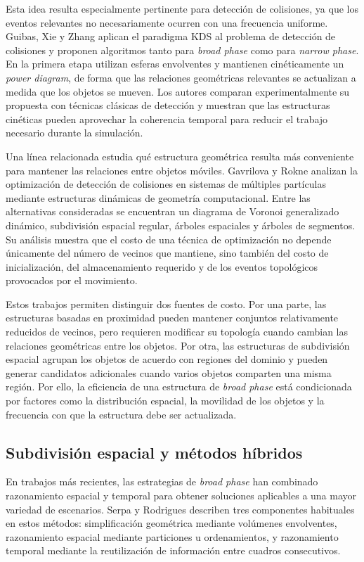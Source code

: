 \documentclass[12pt]{article}
\begin{document}
Esta idea resulta especialmente pertinente para detección de colisiones, ya que los eventos relevantes no necesariamente ocurren con una frecuencia uniforme. Guibas, Xie y Zhang \cite{guibas2001kinetic} aplican el paradigma KDS al problema de detección de colisiones y proponen algoritmos tanto para \textit{broad phase} como para \textit{narrow phase}. En la primera etapa utilizan esferas envolventes y mantienen cinéticamente un \textit{power diagram}, de forma que las relaciones geométricas relevantes se actualizan a medida que los objetos se mueven. Los autores comparan experimentalmente su propuesta con técnicas clásicas de detección y muestran que las estructuras cinéticas pueden aprovechar la coherencia temporal para reducir el trabajo necesario durante la simulación.

Una línea relacionada estudia qué estructura geométrica resulta más conveniente para mantener las relaciones entre objetos móviles. Gavrilova y Rokne \cite{gavrilova2003collision} analizan la optimización de detección de colisiones en sistemas de múltiples partículas mediante estructuras dinámicas de geometría computacional. Entre las alternativas consideradas se encuentran un diagrama de Voronoi generalizado dinámico, subdivisión espacial regular, árboles espaciales y árboles de segmentos. Su análisis muestra que el costo de una técnica de optimización no depende únicamente del número de vecinos que mantiene, sino también del costo de inicialización, del almacenamiento requerido y de los eventos topológicos provocados por el movimiento.

Estos trabajos permiten distinguir dos fuentes de costo. Por una parte, las estructuras basadas en proximidad pueden mantener conjuntos relativamente reducidos de vecinos, pero requieren modificar su topología cuando cambian las relaciones geométricas entre los objetos. Por otra, las estructuras de subdivisión espacial agrupan los objetos de acuerdo con regiones del dominio y pueden generar candidatos adicionales cuando varios objetos comparten una misma región. Por ello, la eficiencia de una estructura de \textit{broad phase} está condicionada por factores como la distribución espacial, la movilidad de los objetos y la frecuencia con que la estructura debe ser actualizada.

\subsection{Subdivisión espacial y métodos híbridos}

En trabajos más recientes, las estrategias de \textit{broad phase} han combinado razonamiento espacial y temporal para obtener soluciones aplicables a una mayor variedad de escenarios. Serpa y Rodrigues \cite{serpa2019flexible} describen tres componentes habituales en estos métodos: simplificación geométrica mediante volúmenes envolventes, razonamiento espacial mediante particiones u ordenamientos, y razonamiento temporal mediante la reutilización de información entre cuadros consecutivos.
\end{document}
